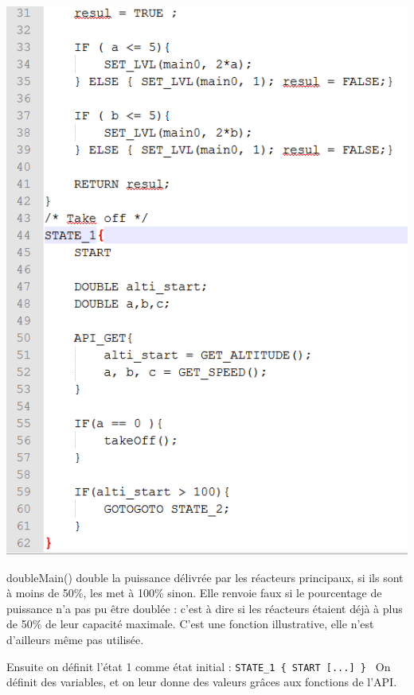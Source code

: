 \documentclass[a4paper,11pt]{article}
\begin{document}
        \begin{center}
            \includegraphics[scale=0.75]{img/otto2.png}
        \end{center}
        doubleMain() double la puissance délivrée par les réacteurs principaux, si ils sont à moins de 50\%, les met à 100\% sinon. Elle renvoie faux si le pourcentage de puissance n'a pas pu être doublée : c'est à dire si les réacteurs étaient déjà à plus de 50\% de leur capacité maximale. C'est une fonction illustrative, elle n'est d'ailleurs même pas utilisée.

        Ensuite on définit l'état 1 comme état initial : \texttt{STATE\_1 \{ START [...] \} }
        On définit des variables, et on leur donne des valeurs grâces aux fonctions de l'API.
\end{document}
